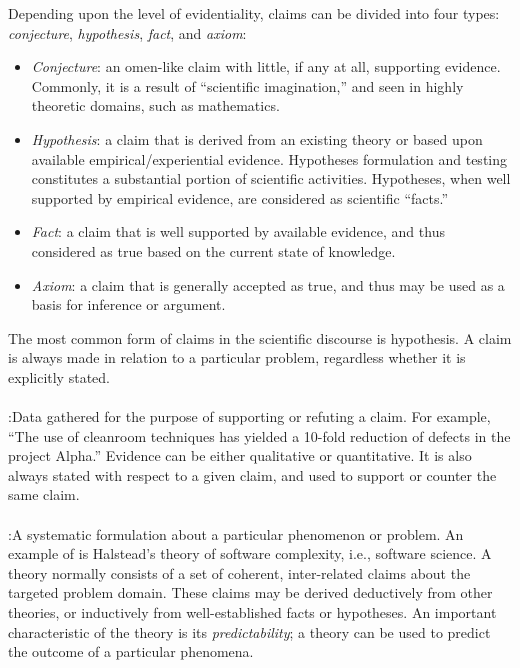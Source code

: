 Depending upon the level of evidentiality, claims can be divided into four
types: {\it conjecture\/}, {\it hypothesis\/}, {\it fact\/}, and {\it
axiom\/}:

\begin{itemize}
\item {\it Conjecture\/}: an omen-like claim with little, if any at all,
  supporting evidence. Commonly, it is a result of ``scientific
  imagination,'' and seen in highly theoretic domains, such as mathematics.
  
\item {\it Hypothesis\/}: a claim that is derived from an existing theory
  or based upon available empirical/experiential evidence. Hypotheses
  formulation and testing constitutes a substantial portion of scientific
  activities. Hypotheses, when well supported by empirical evidence, are 
  considered as scientific ``facts.''
  
\item {\it Fact\/}: a claim that is well supported by available evidence,
  and thus considered as true based on the current state of knowledge.
  
\item {\it Axiom\/}: a claim that is generally accepted as true, and thus
  may be used as a basis for inference or argument.
\end{itemize}

The most common form of claims in the scientific discourse is
{\sf hypothesis\/}. A claim is always made in relation to a particular
problem, regardless whether it is explicitly stated.

\paragraph{}

\noindent{}:\hspace{.2in}Data gathered for the purpose
of supporting or refuting a claim. For example, ``The use of cleanroom
techniques has yielded a 10-fold reduction of defects in the project
Alpha.''  Evidence can be either qualitative or quantitative. It is also
always stated with respect to a given claim, and used to support or counter
the same claim.

\paragraph{}

\noindent{}:\hspace{.2in}A systematic formulation about a
particular phenomenon or problem. An example of  is
Halstead's theory of software complexity, i.e., software science. A theory
normally consists of a set of coherent, inter-related claims about the
targeted problem domain. These claims may be derived deductively from other
theories, or inductively from well-established facts or hypotheses. An
important characteristic of the theory is its {\it predictability\/}; a
theory can be used to predict the outcome of a particular phenomena.

